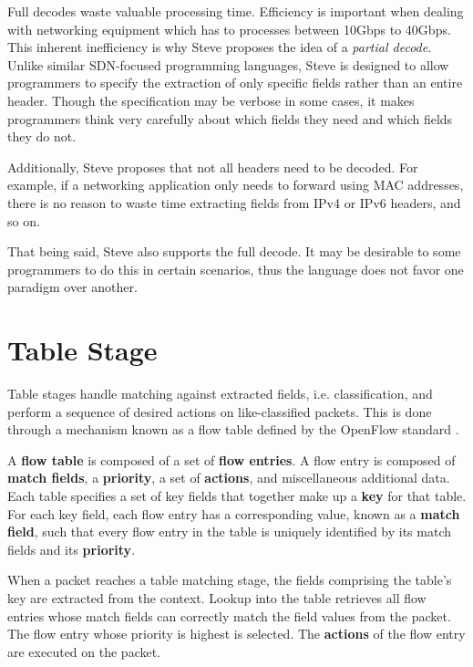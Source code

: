 Full decodes waste valuable processing time. Efficiency is important when dealing with networking equipment which has to processes between 10Gbps to 40Gbps. This inherent inefficiency is why Steve proposes the idea of a \textit{partial decode}. Unlike similar SDN-focused programming languages, Steve is designed to allow programmers to specify the extraction of only specific fields rather than an entire header. Though the specification may be verbose in some cases, it makes programmers think very carefully about which fields they need and which fields they do not. 

Additionally, Steve proposes that not all headers need to be decoded. For example, if a networking application only needs to forward using MAC addresses, there is no reason to waste time extracting fields from IPv4 or IPv6 headers, and so on.

That being said, Steve also supports the full decode. It may be desirable to some programmers to do this in certain scenarios, thus the language does not favor one paradigm over another.

\section{Table Stage} \label{table_desc}

Table stages handle matching against extracted fields, i.e. classification, and perform a sequence of desired actions on like-classified packets. This is done through a mechanism known as a flow table defined by the OpenFlow standard \cite{openflow_spec}.

A \textbf{flow table} is composed of a set of \textbf{flow entries}. A flow entry is composed of \textbf{match fields}, a \textbf{priority}, a set of \textbf{actions}, and miscellaneous additional data. Each table specifies a set of key fields that together make up a \textbf{key} for that table. For each key field, each flow entry has a corresponding value, known as a \textbf{match field}, such that every flow entry in the table is uniquely identified by its match fields and its \textbf{priority}.

When a packet reaches a table matching stage, the fields comprising the table's key are extracted from the context. Lookup into the table retrieves all flow entries whose match fields can correctly match the field values from the packet. The flow entry whose priority is highest is selected. The \textbf{actions} of the flow entry are executed on the packet.

